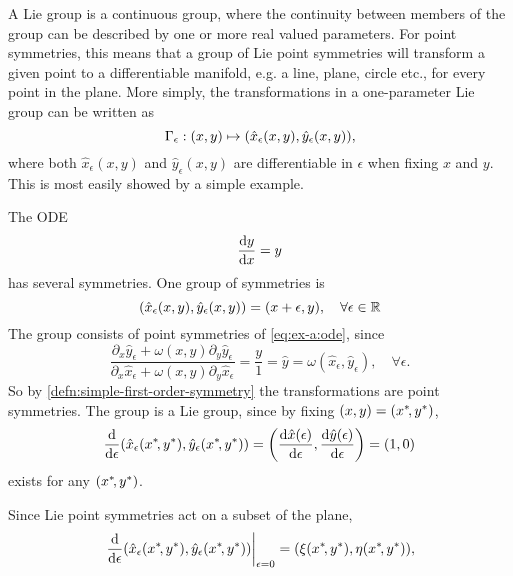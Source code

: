 A Lie group is a continuous group, where the continuity between members of the group can be described by one or more real valued parameters.
For point symmetries, this means that a group of Lie point symmetries will transform a given point to a differentiable manifold, e.g. a line, plane, circle etc., for every point in the plane.
More simply, the transformations in a one-parameter Lie group can be written as
\begin{equation}
  \Gamma_\epsilon: \pqty{x,y} \mapsto \pqty{\hat{x}_\epsilon(x,y), \hat{y}_\epsilon(x,y)},
\end{equation}
where both \(\hat{x}_\epsilon(x,y)\) and \(\hat{y}_\epsilon(x,y)\) are differentiable in \(\epsilon\) when fixing \(x\) and \(y\).
This is most easily showed by a simple example.
\begin{exmp}
  The ODE
  \begin{equation} \label{eq:ex-a:ode}
    \dv{y}{x} = y
  \end{equation}
  has several symmetries.
  One group of symmetries is
  \begin{equation} \label{eq:ex-a:transformation}
    \pqty{\hat{x}_\epsilon(x,y), \hat{y}_\epsilon(x,y)} = \pqty{x + \epsilon, y}, \quad
    \forall \epsilon \in \reals
  \end{equation}
  The group consists of point symmetries of \cref{eq:ex-a:ode}, since
  \begin{equation}
    \frac{\partial_x \hat{y}_\epsilon + \omega(x,y) \partial_y \hat{y}_\epsilon}{\partial_x \hat{x}_\epsilon + \omega(x,y) \partial_y \hat{x}_\epsilon} =
    \frac{y}{1} =
    \hat{y} =
    \omega(\hat{x}_\epsilon,\hat{y}_\epsilon), \quad
    \forall \epsilon.
  \end{equation}
  So by \cref{defn:simple-first-order-symmetry} the transformations are point symmetries.
  The group is a Lie group, since by fixing \(\pqty{x,y}=\pqty{x^*\!,y^*}\),
  \begin{equation}
    \dv{\epsilon} \pqty{\hat{x}_\epsilon(x^*\!,y^*), \hat{y}_\epsilon(x^*\!,y^*)} =
    \pqty{\dv{\hat{x}(\epsilon)}{\epsilon}, \dv{\hat{y}(\epsilon)}{\epsilon}} =
    \pqty{1,0}
  \end{equation}
  exists for any \(\pqty{x^*\!,y^*}\).
\end{exmp}
Since Lie point symmetries act on a subset of the plane,
\begin{equation}
  \eval{\dv{\epsilon} \pqty{\hat{x}_\epsilon(x^*\!,y^*), \hat{y}_\epsilon(x^*\!,y^*)}}_{\epsilon=0} = \pqty{\xi(x^*\!,y^*), \eta(x^*\!,y^*)},
\end{equation}
